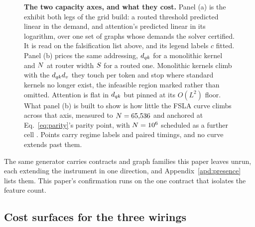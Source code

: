 \begin{figure}[H]
\centering
\begin{minipage}[t]{0.48\linewidth}
\centering\footnotesize
{}
\end{minipage}\hfill
\begin{minipage}[t]{0.48\linewidth}
\centering\footnotesize
{}
\end{minipage}
\caption{\textbf{The two capacity axes, and what they cost.} Panel (a) is the exhibit both legs of the grid build: a routed threshold predicted linear in the demand, and attention's predicted linear in its logarithm, over one set of graphs whose demands the solver certified. It is read on the falsification list above, and its legend labels $c$ fitted. Panel (b) prices the same addressing, $d_{qk}$ for a monolithic kernel and $N$ at router width $S$ for a routed one. Monolithic kernels climb with the $d_{qk} d_v$ they touch per token and stop where standard kernels no longer exist, the infeasible region marked rather than omitted. Attention is flat in $d_{qk}$ but pinned at its $O(L^2)$ floor. What panel (b) is built to show is how little the FSLA curve climbs across that axis, measured to $N = 65{,}536$ and anchored at Eq.~\eqref{eq:parity}'s parity point, with $N = 10^6$ scheduled as a further cell . Points carry regime labels and paired timings, and no curve extends past them.}
\label{fig:axis}
\end{figure}

The same generator carries contracts and graph families this paper leaves unrun, each extending the instrument in one direction, and Appendix~\ref{apd:presence} lists them. This paper's confirmation runs on the one contract that isolates the feature count.


\subsection{Cost surfaces for the three wirings}
\label{sec:sparsify}

